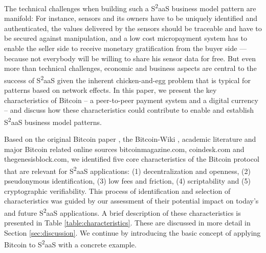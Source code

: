 The technical challenges when building such a S\textsuperscript{2}aaS business model pattern are manifold: For instance, sensors and its owners have to be uniquely identified and authenticated, the values delivered by the sensors should be traceable and have to be secured against manipulation, and a low cost micropayment system has to enable the seller side to receive monetary gratification from the buyer side — because not everybody will be willing to share his sensor data for free. But even more than technical challenges, economic and business aspects are central to the success of S\textsuperscript{2}aaS \cite{bohli2009initial} given the inherent chicken-and-egg problem that is typical for patterns based on network effects. In this paper, we present the key characteristics of Bitcoin -- a peer-to-peer payment system and a digital currency -- and discuss how these characteristics could contribute to enable and establish  S\textsuperscript{2}aaS business model patterns.

Based on the original Bitcoin paper \cite{nakamoto2008bitcoin}, the Bitcoin-Wiki \cite{bitcoinwiki}, academic literature \cite{barber2012bitter, Meiklejohn2013} and major Bitcoin related online sources bitcoinmagazine.com, coindesk.com and thegenesisblock.com, we identified five core characteristics of the Bitcoin protocol that are relevant for S\textsuperscript{2}aaS applications: (1) decentralization and openness, (2) pseudonymous identification, (3) low fees and friction, (4) scriptability and (5) cryptographic verifiability. This process of identification and selection of characteristics was guided by our assessment of their potential impact on today's and future S\textsuperscript{2}aaS applications. A brief description of these characteristics is presented in Table \ref{table:characteristics}. These are discussed in more detail in Section \ref{sec:discussion}. We continue by introducing the basic concept of applying Bitcoin to S\textsuperscript{2}aaS with a concrete example. 

